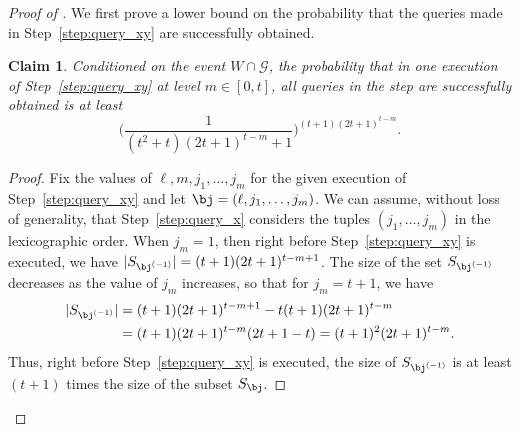 \documentclass[11pt]{article}
\numberwithin{equation}{section}
\newtheorem{claim}[theorem]{Claim}
\theoremstyle{definition}
\theoremstyle{plain}
\begin{document}
\begin{proof}[Proof of ]
    We first prove a lower bound on the probability that the queries made in Step~\ref{step:query_xy} are successfully obtained.
\begin{claim}\label{clm:connect}
Conditioned on the event $W\cap \mathcal{G}$, the probability that in one execution of Step~\ref{step:query_xy} at level $m \in [0,t]$, all queries in the step are successfully obtained is at least
\begin{equation*}
    \Big(\frac{1}{(t^2+t)(2t+1)^{t-m}+1} \Big)^{(t+1)(2t+1)^{t-m}}.
\end{equation*}
\end{claim}
\begin{proof}
Fix the values of $\ell,m, j_1, \dots, j_{m}$ for the given %
execution
of Step~\ref{step:query_xy} and let $\bj = (\ell,j_1, \dots, j_{m})$. 
We can assume, without loss of generality, that Step~\ref{step:query_x} considers the tuples $(j_1, \dots, j_m)$ in the lexicographic order.
When $j_m = 1$, then right before Step~\ref{step:query_xy} is executed, we have $|S_{\bj^{(-1)}}| = (t+1)(2t+1)^{t-m+1}$. The size of the set $S_{\bj^{(-1)}}$ decreases as the value of $j_m$ increases, so that for $j_m = t+1$, we have  
\begin{align}
    |S_{\bj^{(-1)}}| &= (t+1)(2t+1)^{t-m+1} - t(t+1)(2t+1)^{t-m} \nonumber \\
    &= (t+1)(2t+1)^{t-m}(2t+1-t) = (t+1)^2 (2t+1)^{t-m}.\nonumber
\end{align}
Thus, right before Step~\ref{step:query_xy} is executed, the size of  $S_{\bj^{(-1)}}$ is at least $(t+1)$ times the size of the subset $S_{\bj}$.  


\end{proof}
\end{proof}
\end{document}
